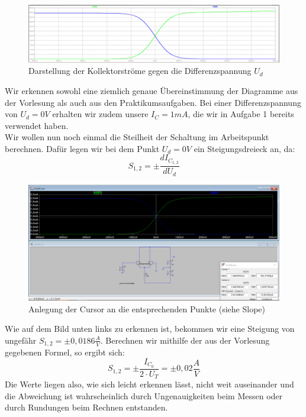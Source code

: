 \documentclass{article}
\begin{document}
\begin{figure}[h]
  \centering
  \includegraphics[scale=0.3]{../assets/images/EL2P1/DeepinScreenshot_select-area_20210417230438.png}
  \caption{Darstellung der Kollektorströme gegen die Differenzspannung $U_d$}
\end{figure}

Wir erkennen sowohl eine ziemlich genaue Übereinstimmung der Diagramme aus der Vorlesung als auch aus den
Praktikumsaufgaben.
Bei einer Differenzspannung von $U_d = 0V$ erhalten wir zudem unsere $I_C = 1 mA$, die wir in Aufgabe 1 bereits
verwendet haben. \\
Wir wollen nun noch einmal die Steilheit der Schaltung im Arbeitspunkt berechnen. Dafür legen wir bei dem Punkt $U_{d} = 0V$ ein Steigungsdreieck an, da:
\begin{equation}
  \label{eq:11}
  S_{1,2} = \pm\frac{dI_{C_{1,2}}}{dU_{d}}
\end{equation}

\begin{figure}[h]
  \centering
  \includegraphics[scale=0.5]{../assets/images/EL2P1/aufgabe2slope.png}
  \caption{Anlegung der Cursor an die entsprechenden Punkte (siehe Slope)}
  \label{fig:diag2}
\end{figure}

Wie auf dem Bild unten links zu erkennen ist, bekommen wir eine Steigung von ungefähr $S_{1,2}=\pm 0,0186 \frac{A}{V}$.
Berechnen wir mithilfe der aus der Vorlesung gegebenen Formel, so ergibt sich\cite{skript}:
\begin{equation}
  \label{eq:12}
  S_{1,2} = \pm \frac{I_{C_{0}}}{2\cdot U_{T}} =\pm 0,02 \frac{A}{V}
\end{equation}
Die Werte liegen also, wie sich leicht erkennen lässt, nicht weit auseinander und die Abweichung ist wahrscheinlich durch Ungenauigkeiten beim Messen oder durch Rundungen beim Rechnen entstanden.
\newpage
\end{document}
